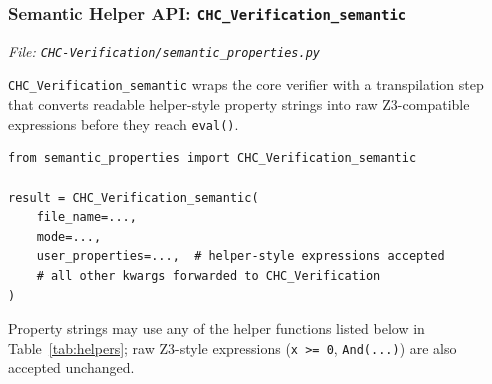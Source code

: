 \subsubsection*{Semantic Helper API: \texttt{CHC\_Verification\_semantic}}

\noindent\textit{\small File: \texttt{CHC-Verification/semantic\_properties.py}}

\texttt{CHC\_Verification\_semantic} wraps the core verifier with a transpilation step
that converts readable helper-style property strings into raw Z3-compatible expressions
before they reach \texttt{eval()}.

\begin{lstlisting}[style=terminal]
from semantic_properties import CHC_Verification_semantic

result = CHC_Verification_semantic(
    file_name=...,
    mode=...,
    user_properties=...,  # helper-style expressions accepted
    # all other kwargs forwarded to CHC_Verification
)
\end{lstlisting}

\noindent Property strings may use any of the helper functions listed below in
Table~\ref{tab:helpers}; raw Z3-style expressions (\texttt{x >= 0}, \texttt{And(...)})
are also accepted unchanged.

